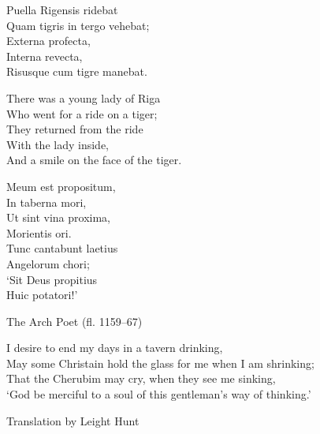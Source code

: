 \documentclass[10pt,a4paper,extrafontsizes]{memoir}
\begin{document}
\begin{minipage}[t]{0.45\textwidth}
Puella Rigensis ridebat \\
Quam tigris in tergo vehebat; \\
\hspace*{2em}Externa profecta,\\ 
\hspace*{2em}Interna revecta,\\ 
Risusque cum tigre manebat.
\end{minipage}
\hfill
\begin{minipage}[t]{0.45\textwidth}
There was a young lady of Riga \\
Who went for a ride on a tiger; \\
\hspace*{2em}They returned from the ride \\
\hspace*{2em}With the lady inside, \\
And a smile on the face of the tiger.
\end{minipage}
\vspace{\onelineskip}

\begin{minipage}[t]{0.45\textwidth}
Meum est propositum,\\  
In taberna mori,\\ 
Ut sint vina proxima,\\ 
Morientis ori.\\ 
Tunc cantabunt laetius\\ 
Angelorum chori;\\ 
`Sit Deus propitius\\ 
Huic potatori!' \par
{\raggedleft\footnotesize  The Arch Poet (fl. 1159--67)\par}
\end{minipage}
\hfill
\begin{minipage}[t]{0.45\textwidth}
I desire to end my days in a tavern drinking, \\
May some Christain hold the glass for me when I am shrinking; \\
That the Cherubim may cry, when they see me sinking, \\
`God be merciful to a soul of this gentleman's way of thinking.' \par
{\raggedleft\footnotesize Translation by Leight Hunt\par}
\end{minipage}
\vspace{\onelineskip}
\end{document}
